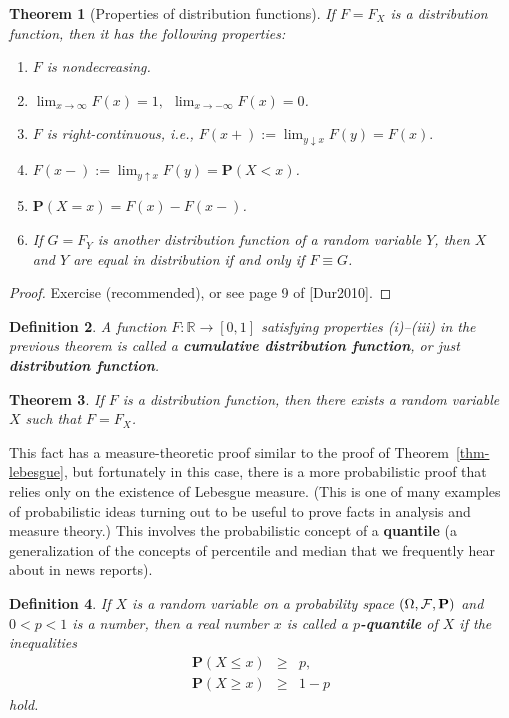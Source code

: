 \documentclass[12pt]{article}
\newtheorem{thm}{Theorem}[section]
\newtheorem{defi}[thm]{Definition}
\newcommand{\R}{\mathbb{R}}
\newcommand{\prob}{\mathbf{P}}
\theoremstyle{example}
\begin{document}
\begin{thm}[Properties of distribution functions]
If $F=F_X$ is a distribution function, then it has the following properties:
\renewcommand{\labelenumi}{(\roman{enumi})}
\begin{enumerate}
\item $F$ is nondecreasing.
\item $\lim_{x\to\infty} F(x) = 1, \ \ \lim_{x\to-\infty} F(x) = 0$.
\item $F$ is right-continuous, i.e., $F(x+) := \lim_{y\downarrow x} F(y) = F(x). $
\item $F(x-) := \lim_{y\uparrow x} F(y) = \prob(X < x)$.
\item $\prob(X=x) = F(x) - F(x-)$.
\item If $G=F_Y$ is another distribution function of a random variable $Y$, then $X$ and $Y$ are equal in distribution if and only if $F \equiv G$.
\end{enumerate}
\end{thm}

\begin{proof} Exercise (recommended), or see page 9 of [Dur2010].
\end{proof}

\begin{defi} A function $F:\R\to[0,1]$ satisfying properties (i)--(iii) in the previous theorem is called a \textbf{cumulative distribution function}, or just \textbf{distribution function}.
\end{defi}

\begin{thm} If $F$ is a distribution function, then there exists a random variable $X$ such that $F=F_X$.
\label{thm-rvexistence}
\end{thm}

This fact has a measure-theoretic proof similar to the proof of Theorem~\ref{thm-lebesgue}, but fortunately in this case, there is a more probabilistic proof that relies only on the existence of Lebesgue measure. (This is one of many examples of probabilistic ideas turning out to be useful to prove facts in analysis and measure theory.) This involves the probabilistic concept of a \textbf{quantile} (a generalization of the concepts of percentile and median that we frequently hear about in news reports).

\begin{defi}
If $X$ is a random variable on a probability space $(\Omega, {\cal F}, \prob)$ and $0<p<1$ is a number, then a real number $x$ is called a \textbf{$p$-quantile} of $X$ if the inequalities
\begin{eqnarray*}
\prob(X \le x) &\ge& p, \\
\prob(X \ge x) & \ge & 1-p 
\end{eqnarray*}
hold.
\end{defi}
\end{document}
